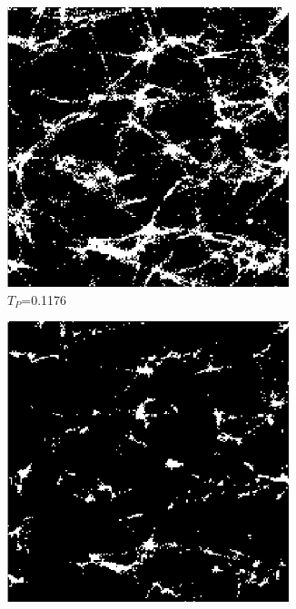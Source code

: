 \begin{figure}[H]
\begin{minipage}{0.5\textwidth}
  \begin{subfigure}{0.5\textwidth}
    \centering
    \includegraphics[width=0.9\textwidth]{Figures/chapter-image/binary/fig_bin_01176Otsu.png}
    \caption{$T_P$=0.1176}
  \end{subfigure}%
  \begin{subfigure}{0.5\textwidth}
    \centering
    \includegraphics[width=0.9\textwidth]{Figures/chapter-image/binary/fig_bin_20.png}

\end{subfigure}
\end{minipage}
\end{figure}
